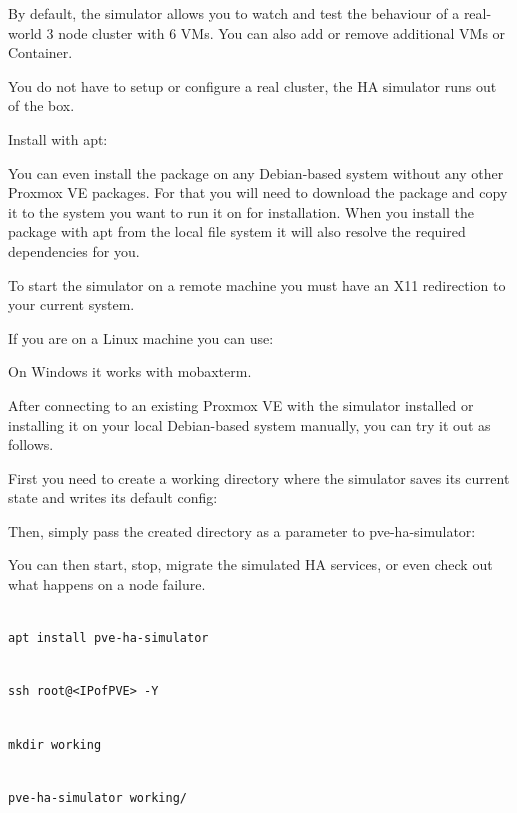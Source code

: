 By default, the simulator allows you to watch and test the behaviour of a real-world 3 node cluster with 6 VMs. You can also add or remove additional VMs or Container.

You do not have to setup or configure a real cluster, the HA simulator runs out of the box.

Install with apt:

You can even install the package on any Debian-based system without any other Proxmox VE packages. For that you will need to download the package and copy it to the system you want to run it on for installation. When you install the package with apt from the local file system it will also resolve the required dependencies for you.

To start the simulator on a remote machine you must have an X11 redirection to your current system.

If you are on a Linux machine you can use:

On Windows it works with mobaxterm.

After connecting to an existing Proxmox VE with the simulator installed or installing it on your local Debian-based system manually, you can try it out as follows.

First you need to create a working directory where the simulator saves its current state and writes its default config:

Then, simply pass the created directory as a parameter to pve-ha-simulator:

You can then start, stop, migrate the simulated HA services, or even check out what happens on a node failure.

\begin{lstlisting}

apt install pve-ha-simulator

\end{lstlisting}

\begin{lstlisting}

ssh root@<IPofPVE> -Y

\end{lstlisting}

\begin{lstlisting}

mkdir working

\end{lstlisting}

\begin{lstlisting}

pve-ha-simulator working/

\end{lstlisting}


